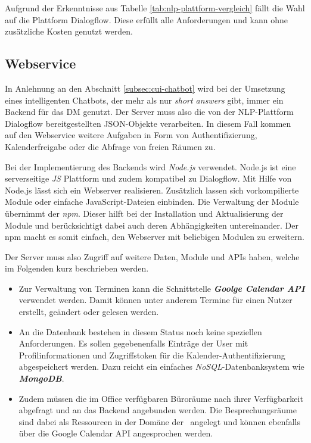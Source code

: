Aufgrund der Erkenntnisse aus Tabelle \ref{tab:nlp-plattform-vergleich} fällt die Wahl auf die Plattform Dialogflow. Diese erfüllt alle Anforderungen und kann ohne zusätzliche Kosten genutzt werden. 

\subsection{Webservice}
\label{subsec:webservice}

In Anlehnung an den Abschnitt \ref{subsec:cui-chatbot} wird bei der Umsetzung eines intelligenten Chatbots, der mehr als nur \textit{short answers} gibt, immer ein Backend für das \acl{DM} genutzt. Der Server muss also die von der \ac{NLP}-Plattform Dialogflow bereitgestellten \ac{JSON}-Objekte verarbeiten. In diesem Fall kommen auf den Webservice weitere Aufgaben in Form von Authentifizierung, Kalenderfreigabe oder die Abfrage von freien Räumen zu. 

Bei der Implementierung des Backends wird \textit{Node.js} verwendet. Node.js ist eine serverseitige \textit{\ac{JS}} Plattform und zudem kompatibel zu Dialogflow. Mit Hilfe von Node.js lässt sich ein Webserver realisieren. Zusätzlich lassen sich vorkompilierte Module oder einfache JavaScript-Dateien einbinden. Die Verwaltung der Module übernimmt der \textit{\ac{npm}}. Dieser hilft bei der Installation und Aktualisierung der Module und berücksichtigt dabei auch deren Abhängigkeiten untereinander. Der \ac{npm} macht es somit einfach, den Webserver mit beliebigen Modulen zu erweitern.

Der Server muss also Zugriff auf weitere Daten, Module und \acp{API} haben, welche im Folgenden kurz beschrieben werden. 

\begin{itemize}
\item Zur Verwaltung von Terminen kann die Schnittstelle \textbf{\textit{Goolge Calendar \ac{API}}} verwendet werden. Damit können unter anderem Termine für einen Nutzer erstellt, geändert oder gelesen werden. 
\item An die Datenbank bestehen in diesem Status noch keine speziellen Anforderungen. Es sollen gegebenenfalls Einträge der User mit Profilinformationen und Zugriffstoken für die Kalender-Authentifizierung abgespeichert werden. Dazu reicht ein einfaches \textit{\ac{NoSQL}}-Datenbank\-system wie \textbf{\textit{MongoDB}}. 
\item Zudem müssen die im Office verfügbaren Büroräume nach ihrer Verfügbarkeit abgefragt und an das Backend angebunden werden. Die Besprechungsräume sind dabei als Ressourcen in der Domäne der \adorsys\ angelegt und können ebenfalls über die Google Calendar \ac{API} angesprochen werden.
\end{itemize}

